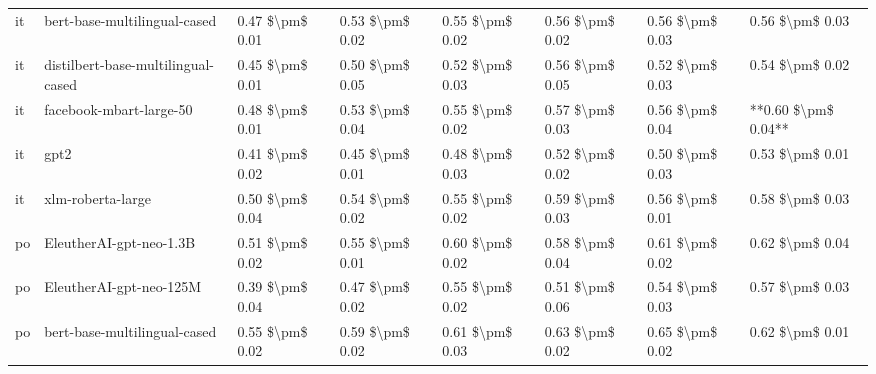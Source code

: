 \begin{tabular}{llllllll}
      it &       bert-base-multilingual-cased & 0.47 \$\textbackslash pm\$ 0.01 &           0.53 \$\textbackslash pm\$ 0.02 &       0.55 \$\textbackslash pm\$ 0.02 &        0.56 \$\textbackslash pm\$ 0.02 &                         0.56 \$\textbackslash pm\$ 0.03 &     0.56 \$\textbackslash pm\$ 0.03 \\
      it & distilbert-base-multilingual-cased & 0.45 \$\textbackslash pm\$ 0.01 &           0.50 \$\textbackslash pm\$ 0.05 &       0.52 \$\textbackslash pm\$ 0.03 &        0.56 \$\textbackslash pm\$ 0.05 &                         0.52 \$\textbackslash pm\$ 0.03 &     0.54 \$\textbackslash pm\$ 0.02 \\
      it &            facebook-mbart-large-50 & 0.48 \$\textbackslash pm\$ 0.01 &           0.53 \$\textbackslash pm\$ 0.04 &       0.55 \$\textbackslash pm\$ 0.02 &        0.57 \$\textbackslash pm\$ 0.03 &                         0.56 \$\textbackslash pm\$ 0.04 & **0.60 \$\textbackslash pm\$ 0.04** \\
      it &                               gpt2 & 0.41 \$\textbackslash pm\$ 0.02 &           0.45 \$\textbackslash pm\$ 0.01 &       0.48 \$\textbackslash pm\$ 0.03 &        0.52 \$\textbackslash pm\$ 0.02 &                         0.50 \$\textbackslash pm\$ 0.03 &     0.53 \$\textbackslash pm\$ 0.01 \\
      it &                  xlm-roberta-large & 0.50 \$\textbackslash pm\$ 0.04 &           0.54 \$\textbackslash pm\$ 0.02 &       0.55 \$\textbackslash pm\$ 0.02 &        0.59 \$\textbackslash pm\$ 0.03 &                         0.56 \$\textbackslash pm\$ 0.01 &     0.58 \$\textbackslash pm\$ 0.03 \\
      po &            EleutherAI-gpt-neo-1.3B & 0.51 \$\textbackslash pm\$ 0.02 &           0.55 \$\textbackslash pm\$ 0.01 &       0.60 \$\textbackslash pm\$ 0.02 &        0.58 \$\textbackslash pm\$ 0.04 &                         0.61 \$\textbackslash pm\$ 0.02 &     0.62 \$\textbackslash pm\$ 0.04 \\
      po &            EleutherAI-gpt-neo-125M & 0.39 \$\textbackslash pm\$ 0.04 &           0.47 \$\textbackslash pm\$ 0.02 &       0.55 \$\textbackslash pm\$ 0.02 &        0.51 \$\textbackslash pm\$ 0.06 &                         0.54 \$\textbackslash pm\$ 0.03 &     0.57 \$\textbackslash pm\$ 0.03 \\
      po &       bert-base-multilingual-cased & 0.55 \$\textbackslash pm\$ 0.02 &           0.59 \$\textbackslash pm\$ 0.02 &       0.61 \$\textbackslash pm\$ 0.03 &        0.63 \$\textbackslash pm\$ 0.02 &                         0.65 \$\textbackslash pm\$ 0.02 &     0.62 \$\textbackslash pm\$ 0.01 \\

\end{tabular}
